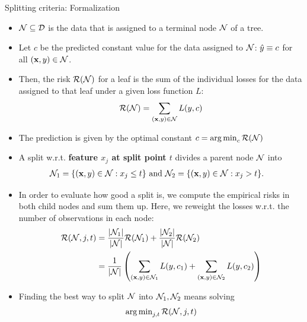 \documentclass[11pt,compress,t,notes=noshow, xcolor=table]{beamer}
\begin{document}
\begin{vbframe}{Splitting criteria: Formalization}

\begin{itemize}
\item $\mathcal{N} \subseteq \mathcal{D}$ is the data that is assigned to a terminal node $\mathcal{N}$ of a tree.
\item Let $c$ be the predicted constant value for the data assigned to $\mathcal{N}$: $\hat{y} \equiv c$ for all $\left(\mathbf{x}, y\right) \in \mathcal{N}$.
\item Then, the risk $\mathcal{R}(\mathcal{N})$ for a leaf is the sum of the individual losses for the data assigned to that leaf under a given loss function $L$:
  $$\mathcal{R}(\mathcal{N}) = \sum\limits_{(\mathbf{x}, y) \in \mathcal{N}} L(y, c)$$
\item The prediction is given by the optimal constant $c = \operatorname{arg\,min}_c \mathcal{R}(\mathcal{N})$
\end{itemize}

\framebreak

\begin{itemize}
\item A split w.r.t. \textbf{feature $x_j$ at split point $t$} divides a parent node $\mathcal{N}$ into 
  \begin{align*}
    \mathcal{N}_1 &= \{ (\mathbf{x}, y) \in \mathcal{N}: x_j \leq t \} \text{ and } \mathcal{N}_2 = \{ (\mathbf{x}, y) \in \mathcal{N}: x_j > t \}.
  \end{align*}
\item   
  In order to evaluate how good a split is, we compute the empirical risks
  in both child nodes and sum them up.
  Here, we reweight the losses w.r.t. the number of observations in each node:
     \begin{align*}
      \mathcal{R}(\mathcal{N}, j, t) &= \frac{|\mathcal{N}_1|}{|\mathcal{N}|} \mathcal{R}(\mathcal{N}_1) + \frac{|\mathcal{N}_2|}{|\mathcal{N}|} \mathcal{R}(\mathcal{N}_2) \\
                  &= \frac{1}{|\mathcal{N}|}\left(\sum\limits_{(\mathbf{x},y) \in \mathcal{N}_1} L(y, c_1) + \sum\limits_{(\mathbf{x},y) \in \mathcal{N}_2} L(y, c_2)\right)
      \end{align*}
  \item Finding the best way to split $\mathcal{N}$ into $\mathcal{N}_1, \mathcal{N}_2$ means solving
  $$\operatorname{arg\,min}_{j, t} \mathcal{R}(\mathcal{N}, j, t)$$
\end{itemize}
\end{vbframe}




\endlecture
\end{document}
